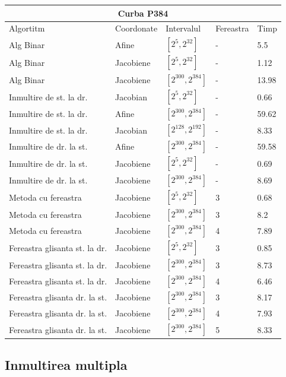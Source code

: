 \begin{tabular}{ |p{5cm}||p{3cm}|p{3cm}|p{2cm}|p{1cm}|  }
 \hline
 \multicolumn{5}{|c|}{Curba P384} \\
 \hline
 Algortitm& Coordonate &Intervalul &Fereastra &Timp\\
 \hline
 Alg Binar & Afine  &$[2^{5},2^{32}]$& - & 5.5\\
 Alg Binar&Jacobiene  & $[2^{5},2^{32}]$ & - & 1.12\\
 Alg Binar&Jacobiene  & $[2^{300},2^{384}]$ & - & 13.98\\
 Inmultire de st. la dr. & Jacobian & $[2^{5},2^{32}]$& - & 0.66\\
 Inmultire de st. la dr. & Afine & $[2^{300},2^{384}]$& - & 59.62\\
 Inmultire de st. la dr. & Jacobian & $[2^{128},2^{192}]$& - & 8.33\\
 Inmultire de dr. la st. &Afine & $[2^{300},2^{384}]$ & - & 59.58\\
 Inmultire de dr. la st. &Jacobiene & $[2^{5},2^{32}]$ & - & 0.69\\
 Inmultire de dr. la st. &Jacobiene & $[2^{300},2^{384}]$ & - & 8.69\\
 Metoda cu fereastra& Jacobiene & $[2^{5},2^{32}]$ & 3 & 0.68\\
 Metoda cu fereastra& Jacobiene & $[2^{300},2^{384}]$ & 3 & 8.2\\
 Metoda cu fereastra& Jacobiene & $[2^{300},2^{384}]$ & 4 & 7.89\\
 Fereastra glisanta st. la dr.& Jacobiene  & $[2^{5},2^{32}]$& 3 & 0.85\\
 Fereastra glisanta st. la dr.& Jacobiene  & $[2^{300},2^{384}]$& 3 & 8.73\\
  Fereastra glisanta st. la dr.& Jacobiene  & $[2^{300},2^{384}]$& 4 & 6.46\\
 Fereastra glisanta dr. la st.& Jacobiene  & $[2^{300},2^{384}]$& 3 & 8.17\\
 Fereastra glisanta dr. la st.& Jacobiene  & $[2^{300},2^{384}]$& 4 & 7.93\\
 Fereastra glisanta dr. la st.& Jacobiene  & $[2^{300},2^{384}]$& 5 & 8.33\\
 \hline
\end{tabular}	

\subsection{Inmultirea multipla}
\label{subsec:subsec04}

